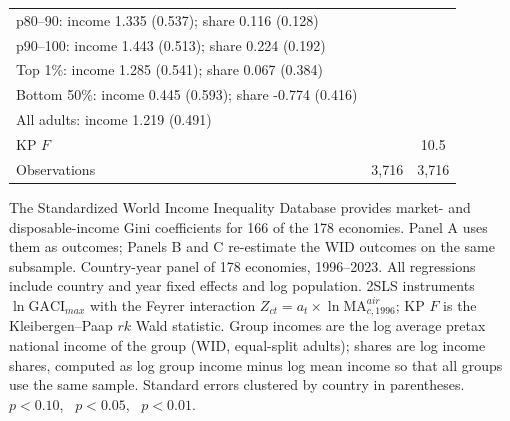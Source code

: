 \begin{table}[p]
\begin{threeparttable}
\begin{tabular}{lcc}
p80--90: income 1.335\sym{**} (0.537); share 0.116 (0.128) & & \\
p90--100: income 1.443\sym{***} (0.513); share 0.224 (0.192) & & \\
Top 1\%: income 1.285\sym{**} (0.541); share 0.067 (0.384) & & \\
Bottom 50\%: income 0.445 (0.593); share -0.774\sym{*} (0.416) & & \\
All adults: income 1.219\sym{**} (0.491) & & \\
\midrule
KP $F$ & & 10.5 \\
Observations & 3{,}716 & 3{,}716 \\
\bottomrule
\end{tabular}
\begin{tablenotes}\small
\item The Standardized World Income Inequality Database \citep{Solt_2020} provides market- and disposable-income Gini coefficients for 166 of the 178 economies. Panel A uses them as outcomes; Panels B and C re-estimate the WID outcomes on the same subsample. Country-year panel of 178 economies, 1996--2023. All regressions include country and year fixed effects and log population. 2SLS instruments $\ln\mathrm{GACI}_{max}$ with the Feyrer interaction $Z_{ct}=a_t\times\ln\mathrm{MA}^{air}_{c,1996}$; KP $F$ is the Kleibergen--Paap $rk$ Wald statistic. Group incomes are the log average pretax national income of the group (WID, equal-split adults); shares are log income shares, computed as log group income minus log mean income so that all groups use the same sample. Standard errors clustered by country in parentheses. \sym{*}~$p<0.10$, \sym{**}~$p<0.05$, \sym{***}~$p<0.01$.
\end{tablenotes}
\end{threeparttable}
\end{table}
